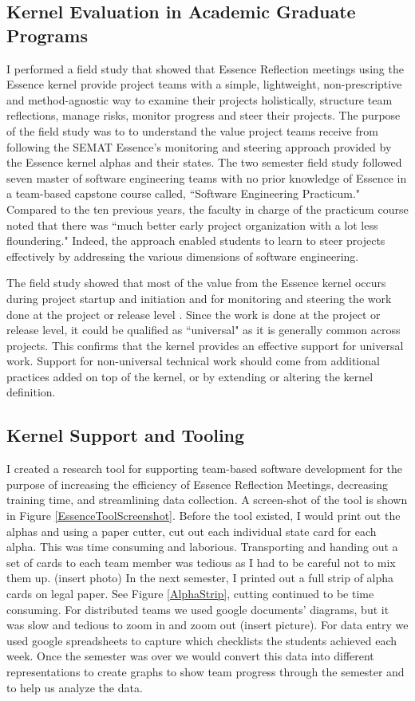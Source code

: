 \documentclass[preprint,12pt,3p]{elsarticle}
\begin{document}
\subsection{Kernel Evaluation in Academic Graduate Programs}
\label{CMUFieldStudy}
I performed a field study \cite{ICSE2014} that showed that Essence Reflection meetings \cite{EASE2014} using the Essence kernel provide project teams with a simple, lightweight, non-prescriptive and method-agnostic way to examine their projects holistically, structure team reflections, manage risks, monitor progress and steer their projects. The purpose of the field study was to to understand the value project teams receive from following the SEMAT Essence’s monitoring and steering approach provided by the Essence kernel alphas and their states. The two semester field study followed seven master of software engineering teams with no prior knowledge of Essence in a team-based capstone course called, ``Software Engineering Practicum." Compared to the ten previous years, the faculty in charge of the practicum course noted that there was ``much better early project organization with a lot less floundering." Indeed, the approach enabled students to learn to steer projects effectively by addressing the various dimensions of software engineering.

The field study showed that most of the value from the Essence kernel occurs during project startup and initiation and for monitoring and steering the work done at the project or release level \cite{ICSE2014}. Since the work is done at the project or release level, it could be qualified as ``universal" as it is generally common across projects. This confirms that the kernel provides an effective support for universal work. Support for non-universal technical work should come from additional practices added on top of the kernel, or by extending or altering the kernel definition.

\subsection{Kernel Support and Tooling}
\label{EssenceTool}
I created a research tool for supporting team-based software development for the purpose of increasing the efficiency of Essence Reflection Meetings, decreasing training time, and streamlining data collection. A screen-shot of the tool is shown in Figure \ref{EssenceToolScreenshot}. Before the tool existed, I would print out the alphas and using a paper cutter, cut out each individual state card for each alpha. This was time consuming and laborious. Transporting and handing out a set of cards to each team member was tedious as I had to be careful not to mix them up. (insert photo) In the next semester, I printed out a full strip of alpha cards on legal paper. See Figure \ref{AlphaStrip}, cutting continued to be time consuming. For distributed teams we used google documents' diagrams, but it was slow and tedious to zoom in and zoom out (insert picture). For data entry we used google spreadsheets to capture which checklists the students achieved each week. Once the semester was over we would convert this data into different representations to create graphs to show team progress through the semester and to help us analyze the data.  
\end{document}
